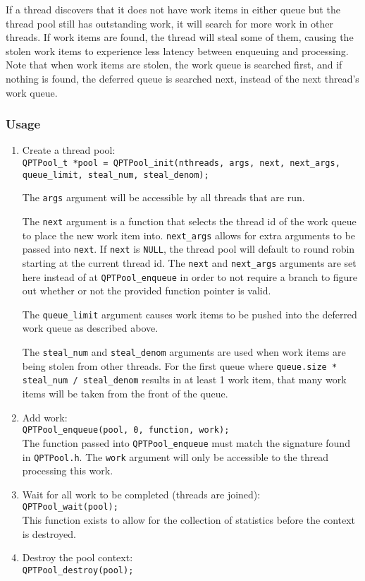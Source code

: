 If a thread discovers that it does not have work items in either queue
but the thread pool still has outstanding work, it will search for
more work in other threads. If work items are found, the thread will
steal some of them, causing the stolen work items to experience less
latency between enqueuing and processing. Note that when work items
are stolen, the work queue is searched first, and if nothing is found,
the deferred queue is searched next, instead of the next thread's work
queue.

\subsubsection{Usage}
\begin{enumerate}
\item Create a thread pool: \\ \texttt{QPTPool\_t *pool =
  QPTPool\_init(nthreads, args, next, next\_args, queue\_limit,
  steal\_num, steal\_denom);}

  The \texttt{args} argument will be accessible by all threads that
  are run.

  The \texttt{next} argument is a function that selects the
  thread id of the work queue to place the new work item
  into. \texttt{next\_args} allows for extra arguments to be passed
  into \texttt{next}. If \texttt{next} is \texttt{NULL}, the thread
  pool will default to round robin starting at the current thread
  id. The \texttt{next} and \texttt{next\_args} arguments are set here
  instead of at \texttt{QPTPool\_enqueue} in order to not require a
  branch to figure out whether or not the provided function pointer is
  valid.

  The \texttt{queue\_limit} argument causes work items to be pushed
  into the deferred work queue as described above.

  The \texttt{steal\_num} and \texttt{steal\_denom} arguments are used
  when work items are being stolen from other threads. For the first
  queue where \texttt{queue.size * steal\_num / steal\_denom} results
  in at least 1 work item, that many work items will be taken from
  the front of the queue.

\item Add work: \\ \texttt{QPTPool\_enqueue(pool, 0, function,
  work);} \\ The function passed into \texttt{QPTPool\_enqueue} must
  match the signature found in \texttt{QPTPool.h}. The \texttt{work}
  argument will only be accessible to the thread processing this work.

\item Wait for all work to be completed (threads are joined):
  \\ \texttt{QPTPool\_wait(pool);} \\ This function exists to allow
  for the collection of statistics before the context is destroyed.

\item Destroy the pool context: \\ \texttt{QPTPool\_destroy(pool);}
\end{enumerate}
